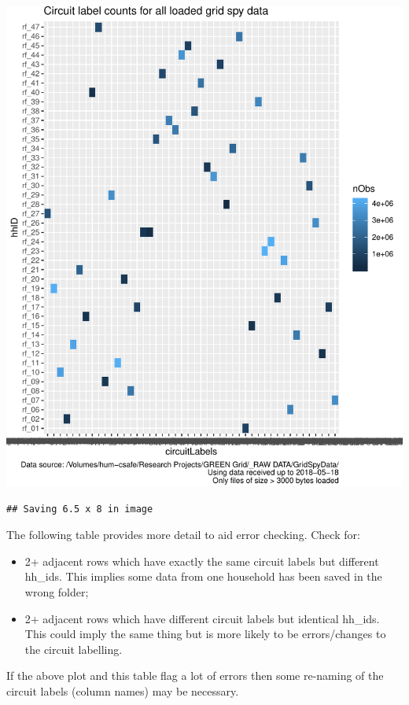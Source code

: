 \documentclass[]{article}
\providecommand{\tightlist}{%
  \setlength{\itemsep}{0pt}\setlength{\parskip}{0pt}}
\begin{document}
\includegraphics{processNZGGElecCons1minData_files/figure-latex/plotCircuitLabelIssuesAsTile-1.pdf}

\begin{verbatim}
## Saving 6.5 x 8 in image
\end{verbatim}

The following table provides more detail to aid error checking. Check
for:

\begin{itemize}
\tightlist
\item
  2+ adjacent rows which have exactly the same circuit labels but
  different hh\_ids. This implies some data from one household has been
  saved in the wrong folder;
\item
  2+ adjacent rows which have different circuit labels but identical
  hh\_ids. This could imply the same thing but is more likely to be
  errors/changes to the circuit labelling.
\end{itemize}

If the above plot and this table flag a lot of errors then some
re-naming of the circuit labels (column names) may be necessary.
\end{document}

